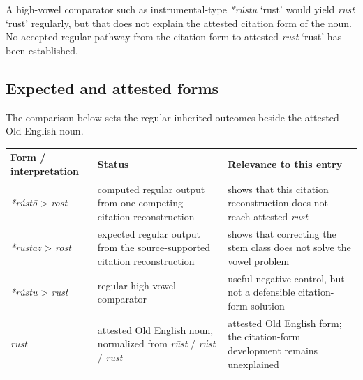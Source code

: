 \documentclass[
  british,
  a4paper,
  openany]{book}
\newcounter{none} %
\providecommand{\Recon}[1]{\emph{*#1}}
{\catcode`→=\active \global\def→{\ensuremath{\rightarrow}}}
\providecommand{\Recon}[1]{\emph{*#1}}
{\catcode`→=\active \global\def→{\ensuremath{\rightarrow}}}
\begin{document}
A high-vowel comparator such as instrumental-type \Recon{rústu} `rust'
would yield {\emph{rust}} `rust' regularly, but that does not explain
the attested citation form of the noun. No accepted regular pathway from
the citation form to attested {\emph{rust}} `rust' has been established.

\subsection{Expected and attested
forms}\label{expected-and-attested-forms-1}

The comparison below sets the regular inherited outcomes beside the
attested Old English noun.

{\def\LTcaptype{none} %
\begin{longtable}[]{@{}
  >{\raggedright\arraybackslash}p{}
  >{\raggedright\arraybackslash}p{}
  >{\raggedright\arraybackslash}p{}@{}}
\toprule\noalign{}
\begin{minipage}[b]{\linewidth}\raggedright
Form / interpretation
\end{minipage} & \begin{minipage}[b]{\linewidth}\raggedright
Status
\end{minipage} & \begin{minipage}[b]{\linewidth}\raggedright
Relevance to this entry
\end{minipage} \\
\midrule\noalign{}
\endhead
\bottomrule\noalign{}
\endlastfoot
\emph{*rústō} \textgreater{} \emph{rost} & computed regular output from
one competing citation reconstruction & shows that this citation
reconstruction does not reach attested \emph{rust} \\
\emph{*rustaz} \textgreater{} \emph{rost} & expected regular output from
the source-supported citation reconstruction & shows that correcting the
stem class does not solve the vowel problem \\
\emph{*rústu} \textgreater{} \emph{rust} & regular high-vowel comparator
& useful negative control, but not a defensible citation-form
solution \\
\emph{rust} & attested Old English noun, normalized from \emph{rūst} /
\emph{rúst} / \emph{rust} & attested Old English form; the citation-form
development remains unexplained \\
\end{longtable}
}
\end{document}
